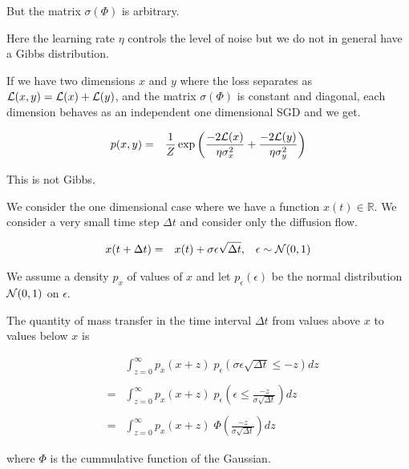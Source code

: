 {\vfill
But the matrix $\sigma(\Phi)$ is arbitrary.

\vfill
Here the learning rate $\eta$ controls the level of noise but we do not in general have a Gibbs distribution.



If we have two dimensions $x$ and $y$ where the loss separates as ${\cal L}(x,y) = {\cal L}(x) + {\cal L}(y)$, and the matrix $\sigma(\Phi)$ is constant and diagonal,
each dimension behaves as an independent one dimensional SGD and we get.

\begin{eqnarray*}
p(x,y) & = & \frac{1}{Z} \exp\left(\frac{-2{\cal L}(x)}{ \eta \sigma_x^2} + \frac{-2{\cal L}(y)}{\eta \sigma_y^2}\right)
\end{eqnarray*}

\vfill
This is not Gibbs.





{\Large
We consider the one dimensional case where we have a function $x(t) \in \mathbb{R}$.  We consider a very small time step $\Delta t$ and consider only the diffusion flow.

\begin{eqnarray*}
x(t + \Delta t) & = & x(t) + \sigma \epsilon \sqrt{\Delta t},\;\;\;\epsilon \sim {\cal N}(0,1)
\end{eqnarray*}

\vfill
We assume a density $p_x$ of values of $x$ and let $p_\epsilon(\epsilon)$ be the normal distribution ${\cal N}(0,1)$ on $\epsilon$.

\vfill
The quantity of mass transfer in the time interval $\Delta t$ from values above $x$ to values below $x$ is

\begin{eqnarray*}
& & \int_{z = 0}^\infty  p_x(x + z)\;p_\epsilon(\sigma\epsilon\sqrt{\Delta t} \leq -z) dz  \\
\\
& = & \int_{z = 0}^\infty  p_x(x + z)\;p_\epsilon\left(\epsilon \leq \frac{-z}{\sigma\sqrt{\Delta t}}\right) dz  \\
\\
& =  & \int_{z = 0}^\infty p_x(x+z)\;\Phi\left(\frac{-z}{\sigma\sqrt{\Delta t}}\right) dz
\end{eqnarray*}

\vfill
where $\Phi$ is the cummulative function of the Gaussian.
}

}
